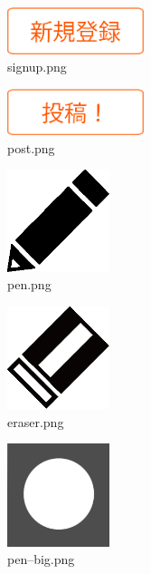\documentclass[a4j,titlepage]{jsarticle}
\begin{document}
\begin{figure}[H]
  \centering
  \includegraphics[width=4cm]{../public/image/signup.png}
  \caption{signup.png}
  \label{fig:signup}
\end{figure}

\begin{figure}[H]
  \centering
  \includegraphics[width=4cm]{../public/image/post.png}
  \caption{post.png}
  \label{fig:post}
\end{figure}

\begin{figure}[H]
  \centering
  \includegraphics[width=3cm]{../public/image/pen.png}
  \caption{pen.png}
  \label{fig:pen}
\end{figure}

\begin{figure}[H]
  \centering
  \includegraphics[width=3cm]{../public/image/eraser.png}
  \caption{eraser.png}
  \label{fig:eraser}
\end{figure}

\begin{figure}[H]
  \centering
  \includegraphics[width=3cm]{../public/image/pen-big.png}
  \caption{pen--big.png}
  \label{fig:penbig}
\end{figure}
\end{document}

